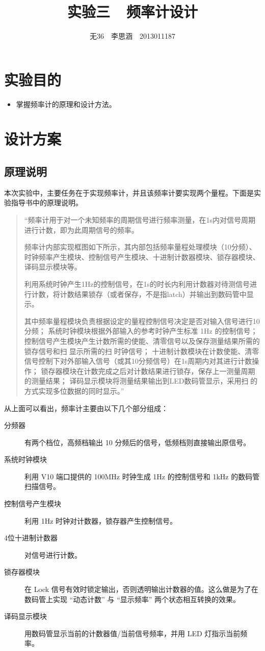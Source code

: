 \documentclass[11pt,a4paper]{article}
\begin{document}
\title{实验三\ \ 频率计设计}
\author{无36$\quad$李思涵$\quad$2013011187}
\maketitle

\section{实验目的}
\begin{itemize}
  \item 掌握频率计的原理和设计方法。
\end{itemize}

\section{设计方案}
\subsection{原理说明}
本次实验中，主要任务在于实现频率计，并且该频率计要实现两个量程。下面是实验指导书中的原理说明。

\begin{quotation}
“频率计用于对一个未知频率的周期信号进行频率测量，在1s内对信号周期进行计数，即为此周期信号的频率。

频率计内部实现框图如下所示，其内部包括频率量程处理模块（10分频）、时钟频率产生模块、控制信号产生模块、十进制计数器模块、锁存器模块、译码显示模块等。

利用系统时钟产生1Hz的控制信号，在1s的时长内利用计数器对待测信号进行计数，将计数结果锁存（或者保存，不是指latch）并输出到数码管中显示。

其中频率量程模块负责根据设定的量程控制信号决定是否对输入信号进行10分频；
系统时钟模块根据外部输入的参考时钟产生标准 1Hz 的控制信号；
控制信号产生模块产生计数所需的使能、清零信号以及保存测量结果所需的锁存信号和扫􏳑显示所需的扫􏳑时钟信号；
十进制计数模块在计数使能、清零信号控制下对外部输入信号（或其10分频信号）在1s周期内对其进行计数操作；
锁存器模块在计数完成之后对计数结果进行锁存，保存上一测量周期的测量结果；
译码显示模块将测量结果输出到LED数码管显示，采用扫􏳑的方式实现多位数据的同时显示。”
\end{quotation}

从上面可以看出，频率计主要由以下几个部分组成：

\begin{description}
  \item[分频器] 有两个档位，高频档输出 10 分频后的信号，低频档则直接输出原信号。
  \item[系统时钟模块] 利用 V10 端口提供的 100MHz 时钟生成 1Hz 的控制信号和 1kHz 的数码管扫描信号。
  \item[控制信号产生模块] 利用 1Hz 时钟对计数器，锁存器产生控制信号。
  \item[4位十进制计数器] 对信号进行计数。
  \item[锁存器模块] 在 Lock 信号有效时锁定输出，否则透明输出计数器的值。这么做是为了在数码管上实现 “动态计数” 与 “显示频率” 两个状态相互转换的效果。
  \item[译码显示模块] 用数码管显示当前的计数器值/当前信号频率，并用 LED 灯指示当前频率。
\end{description}
\end{document}
